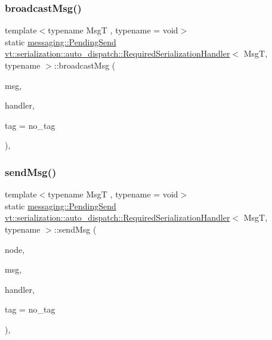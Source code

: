 \subsubsection{\texorpdfstring{broadcast\+Msg()}{broadcastMsg()}}
{\footnotesize\ttfamily template$<$typename MsgT , typename  = void$>$ \\
static \hyperlink{structvt_1_1messaging_1_1_pending_send}{messaging\+::\+Pending\+Send} \hyperlink{structvt_1_1serialization_1_1auto__dispatch_1_1_required_serialization_handler}{vt\+::serialization\+::auto\+\_\+dispatch\+::\+Required\+Serialization\+Handler}$<$ MsgT, typename $>$\+::broadcast\+Msg (\begin{DoxyParamCaption}\item[{MsgT $\ast$}]{msg,  }\item[{\hyperlink{namespacevt_af64846b57dfcaf104da3ef6967917573}{Handler\+Type} const \&}]{handler,  }\item[{\hyperlink{namespacevt_a84ab281dae04a52a4b243d6bf62d0e52}{Tag\+Type} const \&}]{tag = {\ttfamily no\+\_\+tag} }\end{DoxyParamCaption})\hspace{0.3cm}{\ttfamily [inline]}, {\ttfamily [static]}}

\mbox{\label{structvt_1_1serialization_1_1auto__dispatch_1_1_required_serialization_handler_aaa8f18c0e7446bc79879c8e0eae2fede}} 
\subsubsection{\texorpdfstring{send\+Msg()}{sendMsg()}}
{\footnotesize\ttfamily template$<$typename MsgT , typename  = void$>$ \\
static \hyperlink{structvt_1_1messaging_1_1_pending_send}{messaging\+::\+Pending\+Send} \hyperlink{structvt_1_1serialization_1_1auto__dispatch_1_1_required_serialization_handler}{vt\+::serialization\+::auto\+\_\+dispatch\+::\+Required\+Serialization\+Handler}$<$ MsgT, typename $>$\+::send\+Msg (\begin{DoxyParamCaption}\item[{\hyperlink{namespacevt_a866da9d0efc19c0a1ce79e9e492f47e2}{Node\+Type} const \&}]{node,  }\item[{MsgT $\ast$}]{msg,  }\item[{\hyperlink{namespacevt_af64846b57dfcaf104da3ef6967917573}{Handler\+Type} const \&}]{handler,  }\item[{\hyperlink{namespacevt_a84ab281dae04a52a4b243d6bf62d0e52}{Tag\+Type} const \&}]{tag = {\ttfamily no\+\_\+tag} }\end{DoxyParamCaption})\hspace{0.3cm}{\ttfamily [inline]}, {\ttfamily [static]}}



